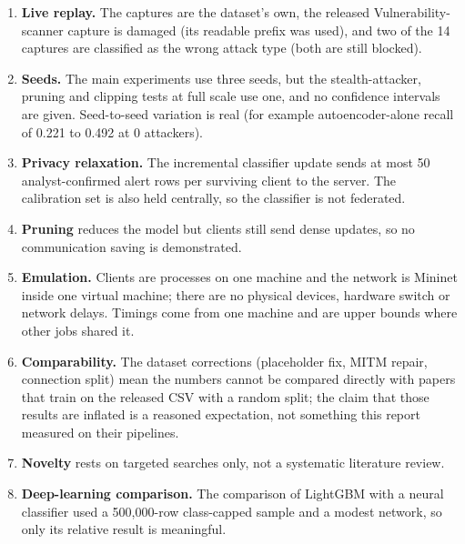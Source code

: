 \begin{enumerate}
  \item \textbf{Live replay.} The captures are the dataset's own, the released Vulnerability-scanner capture is damaged (its readable prefix was used), and two of the 14 captures are classified as the wrong attack type (both are still blocked).
  \item \textbf{Seeds.} The main experiments use three seeds, but the stealth-attacker, pruning and clipping tests at full scale use one, and no confidence intervals are given. Seed-to-seed variation is real (for example autoencoder-alone recall of 0.221 to 0.492 at 0 attackers).
  \item \textbf{Privacy relaxation.} The incremental classifier update sends at most 50 analyst-confirmed alert rows per surviving client to the server. The calibration set is also held centrally, so the classifier is not federated.
  \item \textbf{Pruning} reduces the model but clients still send dense updates, so no communication saving is demonstrated.
  \item \textbf{Emulation.} Clients are processes on one machine and the network is Mininet inside one virtual machine; there are no physical devices, hardware switch or network delays. Timings come from one machine and are upper bounds where other jobs shared it.
  \item \textbf{Comparability.} The dataset corrections (placeholder fix, MITM repair, connection split) mean the numbers cannot be compared directly with papers that train on the released CSV with a random split; the claim that those results are inflated is a reasoned expectation, not something this report measured on their pipelines.
  \item \textbf{Novelty} rests on targeted searches only, not a systematic literature review.
  \item \textbf{Deep-learning comparison.} The comparison of LightGBM with a neural classifier used a 500{,}000-row class-capped sample and a modest network, so only its relative result is meaningful.
\end{enumerate}

